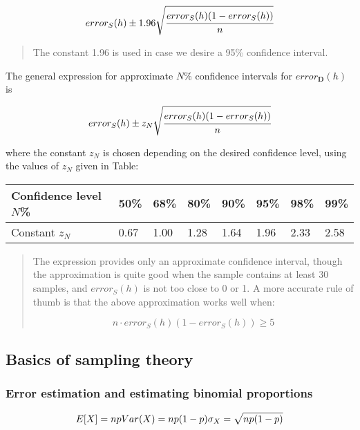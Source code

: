 \[error_S(h)\pm1.96\sqrt{\cfrac{error_S(h)(1-error_S(h))}{n}}\]

\begin{quote}
The constant 1.96 is used in case we desire a 95\% confidence interval.
\end{quote}

The general expression for approximate \(N\)\% confidence intervals for
\(error_{\boldsymbol{D}}(h)\) is

\[error_S(h)\pm z_N\sqrt{\cfrac{error_S(h)(1-error_S(h))}{n}}\]

where the constant \(z_N\) is chosen depending on the desired confidence
level, using the values of \(z_N\) given in Table:

\begin{longtable}[]{@{}llllllll@{}}
\toprule\noalign{}
Confidence level \(N\)\% & 50\% & 68\% & 80\% & 90\% & 95\% & 98\% &
99\% \\
\midrule\noalign{}
\endhead
\bottomrule\noalign{}
\endlastfoot
Constant \(z_N\) & 0.67 & 1.00 & 1.28 & 1.64 & 1.96 & 2.33 & 2.58 \\
\end{longtable}

\begin{quote}
The expression provides only an approximate confidence interval, though
the approximation is quite good when the sample contains at least 30
samples, and \(error_S(h)\) is not too close to 0 or 1. A more accurate
rule of thumb is that the above approximation works well when:

\[n\cdot error_S(h)(1-error_S(h))\ge5\]
\end{quote}

\hypertarget{basics-of-sampling-theory}{%
\subsection{Basics of sampling theory}\label{basics-of-sampling-theory}}

\hypertarget{error-estimation-and-estimating-binomial-proportions}{%
\subsubsection{Error estimation and estimating binomial
proportions}\label{error-estimation-and-estimating-binomial-proportions}}

\[E[X]=np\\
Var(X)=np(1-p)\\
\sigma_X=\sqrt{np(1-p)}\]

